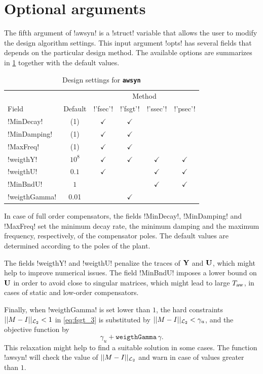 \documentclass[fleqn,11pt]{article}
\newcommand{\lcode}[1]{\textbf{%
    \lstinline[style=mystyle]{#1}}}
\begin{document}
\section{Optional arguments}\label{sec:opts}

The fifth argument of !awsyn! is a !struct! variable that allows the user to modify the design algorithm settings. This input argument !opts! has several fields that depends on the particular design method. The available options are summarizes in \cref{tab:set} together with the default values.

\begin{table}
  \centering
  \begin{tabular}{lccccc}
    \toprule
        & & \multicolumn{4}{c}{Method}\\
    \cline{3-6}
        Field & Default & !'fsec'! & !'fsgt'! & !'ssec'! & !'psec'!\\
    \midrule
        !MinDecay! & (1) & $\checkmark$ & $\checkmark$ & & \\
        !MinDamping! & (1) & $\checkmark$ & $\checkmark$ & & \\
        !MaxFreq!  & (1) & $\checkmark$ & $\checkmark$ & & \\
        !weigthY! & $10^8$ & $\checkmark$ & $\checkmark$ & $\checkmark$ & $\checkmark$ \\
        !weigthU! & $0.1$ & $\checkmark$ &   & $\checkmark$ & $\checkmark$ \\
        !MinBndU! & $1$   &  &   & $\checkmark$ & $\checkmark$ \\
        !weigthGamma! & 0.01 & & $\checkmark$ & & \\
     \bottomrule
  \end{tabular}
  \caption{Design settings for \lcode{awsyn}}\label{tab:set}
\end{table}

In case of full order compensators, the fields !MinDecay!, !MinDamping! and !MaxFreq! set the minimum decay rate, the minimum damping and the maximum frequency, respectively, of the compensator poles. The default values are determined according to the poles of the plant.

The fields !weigthY! and !weigthU! penalize the traces of $\mathbf{Y}$ and $\mathbf{U}$, which might help to improve numerical issues. The field !MinBndU! imposes a lower bound on $\mathbf{U}$ in order to avoid close to singular matrices, which might lead to large $T_{\mathrm{aw}}$, in cases of static and low-order compensators.

Finally, when !weigthGamma! is set lower than $1$, the hard constraints $||M-I||_{\mathcal{L}_2} < 1$ in \cref{eq:fsgt_3} is substituted by $||M-I||_{\mathcal{L}_2} < \gamma_u$, and the objective function by
\begin{equation*}
    \gamma_u + \texttt{weigthGamma}\,\gamma.
\end{equation*}
This relaxation might help to find a suitable solution in some cases. The function !awsyn! will check the value of $||M-I||_{\mathcal{L}_2}$ and warn in case of values greater than $1$.



\end{document}
